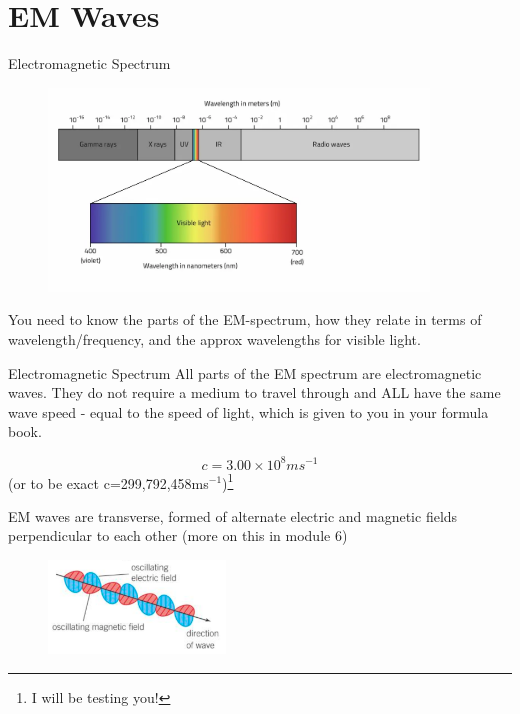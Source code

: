 \documentclass[../Main.tex]{subfiles}
\begin{document}
\author{Electromagnetic Waves} %
\date{Year 1 Topics 16,17} %

\section{EM Waves} %

\begin{frame}{Electromagnetic Spectrum}
    \begin{figure}
        \centering
        \includegraphics[width=0.9\textwidth]{Waves_Images/EMspectrum.png}
    \end{figure}
    You need to know the parts of the EM-spectrum, how they relate in terms of wavelength/frequency, and the approx wavelengths for visible light.
\end{frame}

\begin{frame}{Electromagnetic Spectrum}
    All parts of the EM spectrum are electromagnetic waves. They do not require a medium to travel through and ALL have the same wave speed - equal to the speed of light, which is given to you in your formula book.
    
    \begin{equation*}
        c=3.00 \times 10^ 8 ms^{-1}
    \end{equation*} (or to be exact c=299,792,458ms$^{-1}$)\footnote{I will be testing you!} \newline
    
    EM waves are transverse, formed of alternate electric and magnetic fields perpendicular to each other (more on this in module 6)
    \begin{figure}
        \centering
        \includegraphics[height=2.5cm]{Waves_Images/emwavefields.png}
    \end{figure}
\end{frame}
\end{document}
